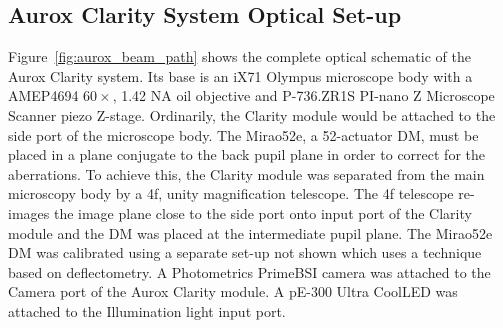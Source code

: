 \subsection{Aurox Clarity System Optical Set-up}
\label{subsec:aurox_optics}

Figure~\ref{fig:aurox_beam_path} shows the complete optical schematic of the Aurox Clarity system. Its base is an iX71 Olympus microscope body with a AMEP4694 $60\times$, 1.42 NA oil objective and P-736.ZR1S PI-nano Z Microscope Scanner piezo Z-stage. Ordinarily, the Clarity module would be attached to the side port of the microscope body. The Mirao52e, a 52-actuator DM, must be placed in a plane conjugate to the back pupil plane in order to correct for the aberrations. To achieve this, the Clarity module was separated from the main microscopy body by a 4f, unity magnification telescope. The 4f telescope re-images the image plane close to the side port onto input port of the Clarity module and the DM was placed at the intermediate pupil plane. The Mirao52e DM was calibrated using a separate set-up not shown which uses a technique based on deflectometry\cite{trumper2016instantaneous,huang2017close}. A Photometrics PrimeBSI camera was attached to the Camera port of the Aurox Clarity module. A pE-300 Ultra CoolLED was attached to the Illumination light input port.

